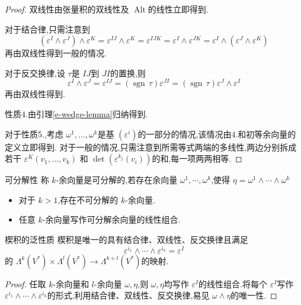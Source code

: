 \documentclass[../../几何与拓扑.tex]{subfiles}
\begin{document}
\begin{proof}
双线性由张量积的双线性及 $ \operatorname{Alt} $的线性立即得到.

对于结合律,只需注意到 $$
\left(  \varepsilon ^{I}\wedge  \varepsilon ^{J} \right)\wedge  \varepsilon ^{K} =  \varepsilon ^{IJ}\wedge  \varepsilon ^{K} =  \varepsilon ^{IJK} =  \varepsilon ^{I}\wedge  \varepsilon ^{JK}=  \varepsilon ^{I} \wedge \left(  \varepsilon ^{J}\wedge  \varepsilon ^{K} \right) 
$$再由双线性得到一般的情况.

对于反交换律,设 $ \tau  $是 $ IJ $到 $ JI $的置换,则 $$
 \varepsilon ^{I}\wedge  \varepsilon ^{J} =  \varepsilon ^{IJ} = \left( \operatorname{sgn}\,\tau  \right)  \varepsilon ^{JI} = \left( \operatorname{sgn}\,\tau  \right)  \varepsilon ^{J}\wedge   \varepsilon ^{I}  
$$ 再由双线性得到.

性质4.由引理\ref{e-wedge-lemma}归纳得到.

对于性质5.,考虑 $  \omega ^{1}, \ldots , \omega ^{k} $是基 $ \left(  \varepsilon ^{i} \right)  $的一部分的情况,该情况由4.和初等余向量的定义立即得到.
对于一般的情况,只需注意到所需等式两端的多线性,两边分别拆成若干 $  \varepsilon ^{K} \left( v_1, \ldots ,v_{k} \right)  $  和 $ \det \left(   \varepsilon ^{k_{j}}\left( v_{i} \right)  \right)  $的和,每一项两两相等.  
\end{proof}
\begin{definition}{可分解性}
    称 $ k $-余向量是可分解的,若存在余向量 $  \omega^{1},\cdots , \omega ^{k} $,使得 $ \eta = \omega ^{1}\wedge \cdots \wedge  \omega ^{k} $   
\end{definition}
\begin{remark}
    \begin{itemize}
        \item 对于 $ k>1 $,存在不可分解的 $ k $-余向量.
        \item 任意 $ k $-余向量写作可分解余向量的线性组合. 
    \end{itemize}
      
\end{remark}
\begin{proposition}{楔积的泛性质}
楔积是唯一的具有结合律、双线性、反交换律且满足 $$
 \varepsilon ^{i_1}\wedge \cdots \wedge  \varepsilon ^{i_{k}} =  \varepsilon ^{I}
$$的 $  \Lambda ^{k}\left( V^{*} \right) \times  \Lambda ^{l}\left( V^{*} \right)\to  \Lambda ^{k+ l}\left( V^{*} \right)    $的映射. 
\end{proposition}
\begin{proof}
    任取 $ k $-余向量和 $ l $-余向量 $  \omega ,\eta  $,则 $  \omega ,\eta  $均写作 $  \varepsilon ^{I} $的线性组合.将每个 $  \varepsilon ^{I} $写作 $  \varepsilon ^{i_1}\wedge \cdots \wedge  \varepsilon ^{i_{k}} $的形式,利用结合律、双线性、反交换律,易见 $  \omega \wedge \eta  $的唯一性.        

\end{proof}
\end{document}
